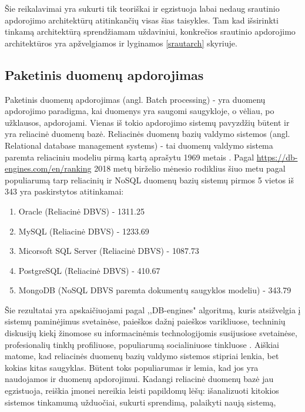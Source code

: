 \documentclass{VUMIFPSkursinis}
\begin{document}
        Šie reikalavimai yra sukurti tik teoriškai ir egzistuoja labai nedaug srautinio apdorojimo architektūrų atitinkančių visas šias taisykles. Tam kad išsirinkti tinkamą architektūrą sprendžiamam uždaviniui, 
        konkrečios srautinio apdorojimo architektūros yra apžvelgiamos ir lyginamos \ref{srautarch} skyriuje.

\subsection{Paketinis duomenų apdorojimas}
    Paketinis duomenų apdorojimas (angl. Batch processing) - yra duomenų apdorojimo paradigma, kai duomenys yra saugomi saugykloje, o vėliau, po užklausos, apdorojami.
    Vienas iš tokio apdorojimo sistemų pavyzdžių būtent ir yra reliacinė duomenų bazė. Reliacinės duomenų bazių valdymo sistemos (angl. Relational database management systems) - tai 
    duomenų valdymo sistema paremta reliaciniu modeliu pirmą kartą aprašytu 1969 metais \cite{codd1969derivability}.
    Pagal \url{https://db-engines.com/en/ranking} 2018 metų birželio mėnesio rodiklius šiuo metu pagal populiarumą tarp reliacinių ir NoSQL duomenų bazių sistemų pirmos 5 vietos iš 343 yra paskirstytos atitinkamai:
    \begin{enumerate}
        \item Oracle (Reliacinė DBVS) - 1311.25
        \item MySQL (Reliacinė DBVS) - 1233.69
        \item Micorsoft SQL Server (Reliacinė DBVS) - 1087.73
        \item PostgreSQL (Reliacinė DBVS) - 410.67
        \item MongoDB (NoSQL DBVS paremta dokumentų saugyklos modeliu) - 343.79
    \end{enumerate}\par
        Šie rezultatai yra apskaičiuojami pagal ,,DB-engines" algoritmą, kuris atsižvelgia į sistemų paminėjimus svetainėse, paieškos dažnį paieškos varikliuose, techninių diskusijų kiekį
       žinomose su informacinėmis technologijomis susijusiose svetainėse, profesionalių tinklų profiliuose, populiarumą socialiniuose tinkluose \cite{dbengines}. Aiškiai matome, kad reliacinės
    duomenų bazių valdymo sistemos stipriai lenkia, bet kokias kitas saugyklas. Būtent toks populiarumas ir lemia, kad jos yra naudojamos ir duomenų apdorojimui. Kadangi reliacinė
    duomenų bazė jau egzistuoja, reiškia įmonei nereikia leisti papildomų lėšų: išanalizuoti kitokios sistemos tinkamumą užduočiai, sukurti sprendimą, palaikyti naują sistemą, 
\end{document}
